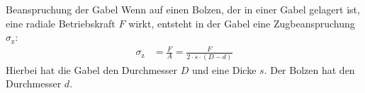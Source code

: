 \begin{eeqn}{Beanspruchung der Gabel}
	Wenn auf einen Bolzen, der in einer Gabel gelagert ist, eine radiale Betriebskraft $F$ wirkt, entsteht in der Gabel eine Zugbeanspruchung $\sigma_\text{z}$:
	\begin{align}
		\sigma_\text{z} &= \frac{F}{A} = \frac{F}{2\cdot s\cdot (D-d)}
	\end{align}
	Hierbei hat die Gabel den Durchmesser $D$ und eine Dicke $s$. Der Bolzen hat den Durchmesser $d$. 
\end{eeqn}